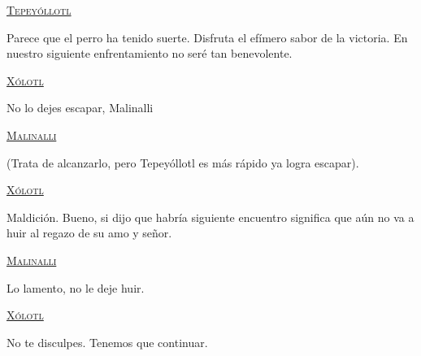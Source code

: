 \documentclass[11pt,letterpaper]{article}
\begin{document}
\begin{center}
\textsc{\underline{Tepeyóllotl}}
\\
\par
Parece que el perro ha tenido suerte. Disfruta el efímero sabor de la victoria. En nuestro siguiente enfrentamiento no seré tan benevolente.
\\
\par
\textsc{\underline{Xólotl}}
\\
\par
No lo dejes escapar, Malinalli
\\
\par
\textsc{\underline{Malinalli}}
\\
\par
(Trata de alcanzarlo, pero Tepeyóllotl es más rápido ya logra escapar).
\\
\par
\textsc{\underline{Xólotl}}
\\
\par
Maldición. Bueno, si dijo que habría siguiente encuentro significa que aún no va a huir al regazo de su amo y señor.
\\
\par
\textsc{\underline{Malinalli}}
\\
\par
Lo lamento, no le deje huir.
\\
\par
\textsc{\underline{Xólotl}}
\\
\par
No te disculpes. Tenemos que continuar.
\end{center}
\end{document}
